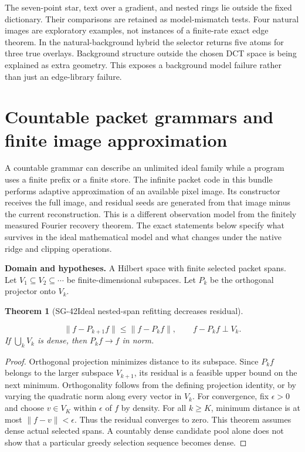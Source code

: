 \documentclass[11pt]{article}
\newtheorem{theorem}{Theorem}[section]
\theoremstyle{definition}\newtheorem{definition}[theorem]{Definition}
\theoremstyle{remark}\newtheorem{remark}[theorem]{Remark}
\begin{document}
The seven-point star, text over a gradient, and nested rings lie outside the
fixed dictionary. Their comparisons are retained as model-mismatch tests.
Four natural images are exploratory examples, not instances of a finite-rate
exact edge theorem. In the natural-background hybrid the selector returns
five atoms for three true overlays. Background structure outside the chosen
DCT space is being explained as extra geometry. This exposes a background
model failure rather than just an edge-library failure.


\section{Countable packet grammars and finite image approximation}

A countable grammar can describe an unlimited ideal family while a program
uses a finite prefix or a finite store. The infinite packet code in this
bundle performs adaptive approximation of an available pixel image. Its
constructor receives the full image, and residual seeds are generated from
that image minus the current reconstruction. This is a different observation
model from the finitely measured Fourier recovery theorem.
The exact statements below specify what survives in the ideal mathematical
model and what changes under the native ridge and clipping operations.


\par{\small\textbf{Domain and hypotheses.} A Hilbert space with finite selected packet spans. Let $V_1\subseteq V_2\subseteq\cdots$ be finite-dimensional subspaces. Let $P_k$ be the orthogonal projector onto $V_k$.}\par
\begin{theorem}[SG-42\quad Ideal nested-span refitting decreases residual]\label{SG-42}

\[
 \|f-P_{k+1}f\|\le\|f-P_kf\|,
 \qquad f-P_kf\perp V_k.
\]
If $\bigcup_kV_k$ is dense, then $P_kf\to f$ in norm.

\end{theorem}
\begin{proof}

Orthogonal projection minimizes distance to its subspace. Since $P_kf$
belongs to the larger subspace $V_{k+1}$, its residual is a feasible upper
bound on the next minimum. Orthogonality follows from the defining projection
identity, or by varying the quadratic norm along every vector in $V_k$.
For convergence, fix $\epsilon>0$ and choose $v\in V_K$ within $\epsilon$
of $f$ by density. For all $k\ge K$, minimum distance is at most
$\|f-v\|<\epsilon$. Thus the residual converges to zero.
This theorem assumes dense actual selected spans. A countably dense candidate
pool alone does not show that a particular greedy selection sequence becomes
dense.

\end{proof}
\end{document}
